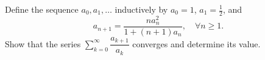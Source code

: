 Define the sequence $a_0,a_1,\dots$ inductively by $a_0=1$, $a_1=\frac{1}{2}$, and
\[a_{n+1}=\dfrac{n a_n^2}{1+(n+1)a_n}, \quad \forall n \ge 1.\]
Show that the series $\displaystyle \sum_{k=0}^\infty \dfrac{a_{k+1}}{a_k}$ converges and determine its value.

